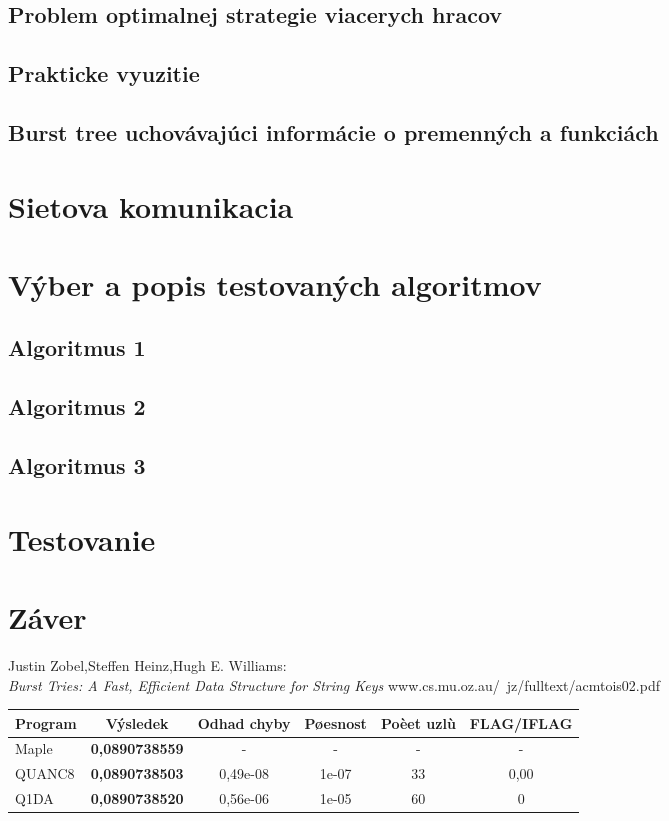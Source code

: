 \documentclass[12pt,notitlepage]{report}
\begin{document}
\section{Problem optimalnej strategie viacerych hracov}
\section{Prakticke vyuzitie}

\section {Burst tree uchovávajúci informácie o premenných a funkciách} 
\chapter{Sietova komunikacia}
\chapter{Výber a popis testovaných algoritmov}
\section{Algoritmus 1}
\section{Algoritmus 2}
\section{Algoritmus 3}
\chapter{Testovanie}

\chapter{Záver}
\newpage
{}
\begin{thebibliography}{99}
Justin Zobel,Steffen Heinz,Hugh E. Williams:\\
{\it Burst Tries: A Fast, Efficient Data Structure for String Keys} www.cs.mu.oz.au/~jz/fulltext/acmtois02.pdf
\end{thebibliography}
\begin{tabular}{|l|c|c|c|c|c|} 
     \hline 
     {\bf Program} & {\bf Výsledek} & {\bf Odhad chyby} & {\bf Pøesnost} & {\bf Poèet uzlù} &  {\bf FLAG/IFLAG} \\ 
     \hline                    
     \hline 
     Maple  & \textbf{0,0890738559} & -         & -     & -  & -    \\ 
     \hline 
     QUANC8 & \textbf{0,0890738503} & 0,49e-08  & 1e-07 & 33 & 0,00 \\ 
     \hline 
     Q1DA   & \textbf{0,0890738520} & 0,56e-06  & 1e-05 & 60 & 0    \\ 
     \hline 
     \end{tabular}
\end{document}

